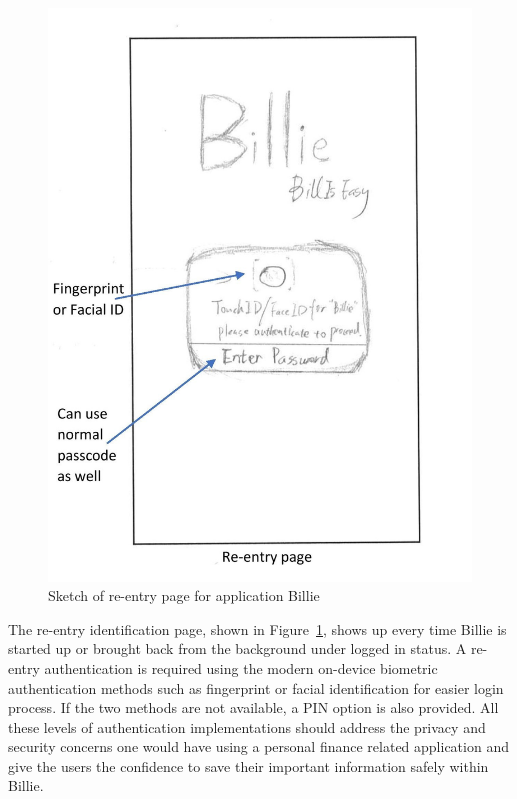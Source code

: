 \documentclass{sigchi}
\begin{document}
\begin{figure}[h!]
\centering
  \includegraphics[width=0.6\columnwidth]{6-re-entry-page.jpg}
  \caption{Sketch of re-entry page for application Billie}
  \label{fig:figure21}
\end{figure}
The re-entry identification page, shown in Figure~\ref{fig:figure21}, shows up every time Billie is started up or brought back from the background under logged in status. A re-entry authentication is required using the modern on-device biometric authentication methods such as fingerprint or facial identification for easier login process. If the two methods are not available, a PIN option is also provided. All these levels of authentication implementations should address the privacy and security concerns one would have using a personal finance related application and give the users the confidence to save their important information safely within Billie.
\end{document}
